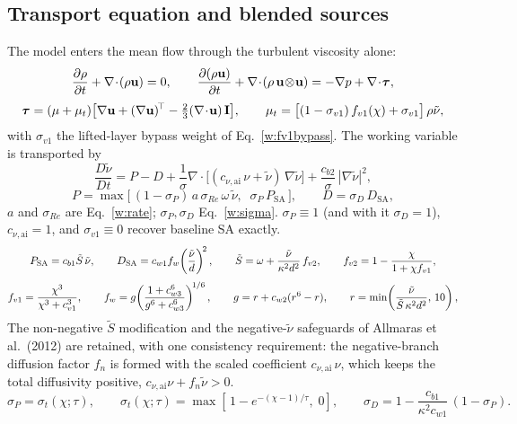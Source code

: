 \documentclass[10pt]{article}
\begin{document}
\subsection{Transport equation and blended sources}

The model enters the mean flow through the turbulent viscosity alone:
\begin{gather}
  \frac{\partial\rho}{\partial t} + \nabla\!\cdot\!(\rho\mathbf u) = 0,
  \qquad
  \frac{\partial(\rho\mathbf u)}{\partial t}
    + \nabla\!\cdot\!(\rho\,\mathbf u\!\otimes\!\mathbf u)
    = -\nabla p + \nabla\!\cdot\!\boldsymbol\tau, \notag\\[3pt]
  \boldsymbol\tau = (\mu+\mu_t)\big[\nabla\mathbf u
    + (\nabla\mathbf u)^{\!\top}
    - \tfrac23(\nabla\!\cdot\!\mathbf u)\,\mathbf I\big],
  \qquad
  \mu_t = \big[(1-\sigma_{v1})\,f_{v1}(\chi)+\sigma_{v1}\big]\,\rho\tilde\nu,
  \label{w:ns}
\end{gather}
with $\sigma_{v1}$ the lifted-layer bypass weight of Eq.~\eqref{w:fv1bypass}. The
working variable is transported by
\begin{equation}
  \frac{D\tilde\nu}{Dt} = P - D
  + \frac{1}{\sigma}\nabla\!\cdot\!\big[(c_{\nu,\mathrm{ai}}\,\nu+\tilde\nu)\,\nabla\tilde\nu\big]
  + \frac{c_{b2}}{\sigma}\,|\nabla\tilde\nu|^2,
  \label{w:sa}
\end{equation}
\begin{equation}
  P = \max\!\big[\,(1-\sigma_P)\,a\,\sigma_{Re}\,\omega\,\tilde\nu,\;\;\sigma_P\,P_\mathrm{SA}\,\big],
  \qquad
  D = \sigma_D\,D_\mathrm{SA},
  \label{w:blend}
\end{equation}
$a$ and $\sigma_{Re}$ are Eq.~\eqref{w:rate}; $\sigma_P,\sigma_D$ Eq.~\eqref{w:sigma}.
$\sigma_P\!\equiv\!1$ (and with it $\sigma_D\!=\!1$),
$c_{\nu,\mathrm{ai}}\!=\!1$, and $\sigma_{v1}\!\equiv\!0$ recover baseline SA
exactly.
\begin{gather}
  P_\mathrm{SA} = c_{b1}\tilde S\,\tilde\nu, \qquad
  D_\mathrm{SA} = c_{w1}f_w\!\left(\frac{\tilde\nu}{d}\right)^{\!2}, \qquad
  \tilde S = \omega + \frac{\tilde\nu}{\kappa^2 d^2}\,f_{v2}, \qquad
  f_{v2} = 1 - \frac{\chi}{1+\chi f_{v1}}, \notag\\[3pt]
  f_{v1} = \frac{\chi^3}{\chi^3+c_{v1}^3}, \qquad
  f_w = g\!\left(\frac{1+c_{w3}^6}{g^6+c_{w3}^6}\right)^{\!1/6}, \qquad
  g = r + c_{w2}(r^6-r), \qquad
  r = \min\!\left(\frac{\tilde\nu}{\tilde S\,\kappa^2 d^2},\,10\right),
  \label{w:closure}
\end{gather}
The
non-negative $\tilde S$ modification and the negative-$\tilde\nu$
safeguards of Allmaras et al.\ (2012) are retained, with one
consistency requirement: the negative-branch diffusion factor $f_n$ is
formed with the scaled coefficient $c_{\nu,\mathrm{ai}}\,\nu$, which
keeps the total diffusivity positive,
$c_{\nu,\mathrm{ai}}\nu+f_n\tilde\nu>0$.
\begin{equation}
  \sigma_P = \sigma_t(\chi;\tau), \qquad
  \sigma_t(\chi;\tau) = \max\!\left[\,1-e^{-(\chi-1)/\tau},\;0\right], \qquad
  \sigma_D = 1-\frac{c_{b1}}{\kappa^2c_{w1}}\,(1-\sigma_P).
  \label{w:sigma}
\end{equation}
\end{document}
